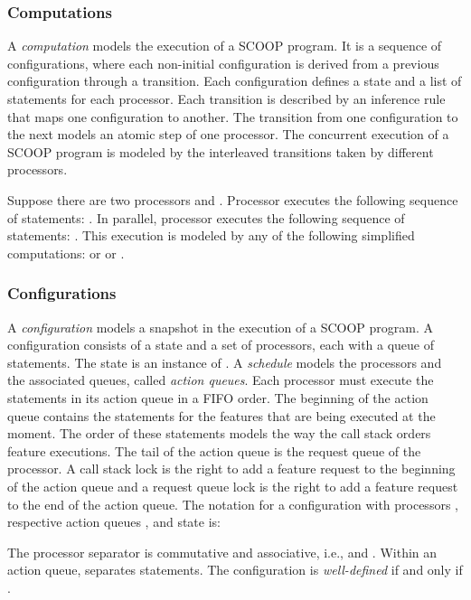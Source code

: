\subsubsection{Computations}
A \emph{computation} models the execution of a SCOOP program. It is a sequence of configurations, where each non-initial configuration is derived from a previous configuration through a transition. Each configuration defines a state and a list of statements for each processor. Each transition is described by an inference rule that maps one configuration to another. The transition from one configuration to the next models an atomic step of one processor. The concurrent execution of a SCOOP program is modeled by the interleaved transitions taken by different processors.
\begin{example}
Suppose there are two processors  and . Processor  executes the following sequence of statements: . In parallel, processor  executes the following sequence of statements: . This execution is modeled by any of the following simplified computations:  or  or .
\end{example}

\subsubsection{Configurations}
A \emph{configuration} models a snapshot in the execution of a SCOOP program. A configuration consists of a state and a set of processors, each with a queue of statements. The state is an instance of . A \emph{schedule} models the processors and the associated queues, called \emph{action queues}. Each processor must execute the statements in its action queue in a FIFO order. The beginning of the action queue contains the statements for the features that are being executed at the moment. The order of these statements models the way the call stack orders feature executions. The tail of the action queue is the request queue of the processor. A call stack lock is the right to add a feature request to the beginning of the action queue and a request queue lock is the right to add a feature request to the end of the action queue. The notation for a configuration with processors , respective action queues , and state  is:


The processor separator  is commutative and associative, i.e.,  and . Within an action queue,  separates statements. The configuration is \emph{well-defined} if and only if .


